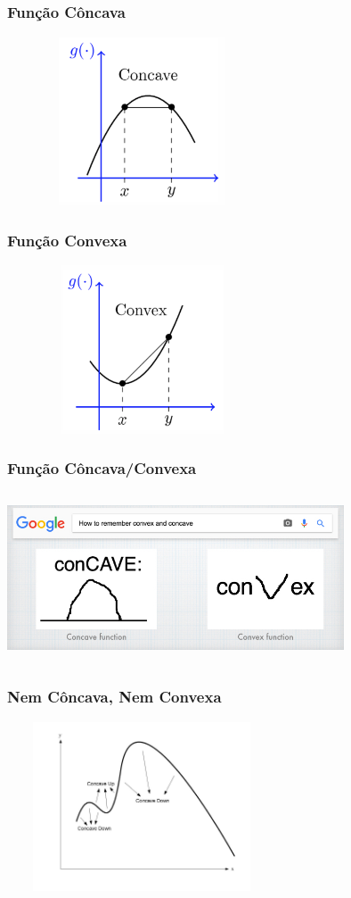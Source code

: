 \documentclass{beamer}
\begin{document}
\begin{frame}
	\centering
	{
	\frametitle{Função Côncava}
	\includegraphics[width=8cm,height=5cm]{concava.png}	
	}
	{
	\frametitle{Função Convexa}
	\includegraphics[width=8cm,height=5cm]{convexa.png}	
	}
	{
	\frametitle{Função Côncava/Convexa}
	\includegraphics[width=10cm,height=5cm]{concaveandconvexgoogle.jpg}	
	}
	{
	\frametitle{Nem Côncava, Nem Convexa }
	\includegraphics[width=8cm,height=5cm]{nemconcavonemconvexo.jpg}	
	}
\end{frame}
\end{document}
